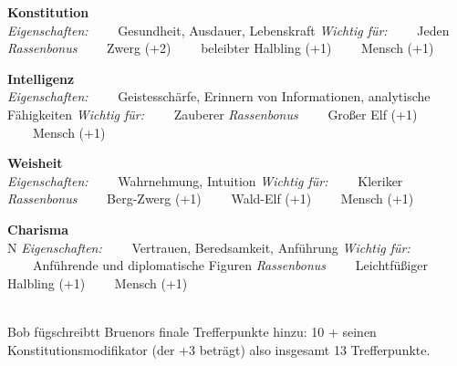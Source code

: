 \begin{dndtable}
	\textbf{Konstitution} \\
	\textit{Eigenschaften:} \newline
	\ \ \ \ Gesundheit, Ausdauer, Lebenskraft \newline
	\textit{Wichtig für:} \newline
	\ \ \ \ Jeden \newline
	\textit{Rassenbonus} \newline
	\ \ \ \ Zwerg (+2) \newline
	\ \ \ \ beleibter Halbling (+1) \newline
	\ \ \ \ Mensch (+1)
\end{dndtable}

\begin{dndtable}
	\textbf{Intelligenz} \\
	\textit{Eigenschaften:} \newline
	\ \ \ \ Geistesschärfe, Erinnern von Informationen, analytische Fähigkeiten \newline
	\textit{Wichtig für:} \newline
	\ \ \ \ Zauberer \newline
	\textit{Rassenbonus} \newline
	\ \ \ \ Großer Elf (+1) \newline
	\ \ \ \ Mensch (+1)
\end{dndtable}

\begin{dndtable}
	\textbf{Weisheit} \\
	\textit{Eigenschaften:} \newline
	\ \ \ \ Wahrnehmung, Intuition \newline
	\textit{Wichtig für:} \newline
	\ \ \ \ Kleriker \newline
	\textit{Rassenbonus} \newline
	\ \ \ \ Berg-Zwerg (+1) \newline
	\ \ \ \ Wald-Elf (+1) \newline
	\ \ \ \ Mensch (+1)
\end{dndtable}

\begin{dndtable}
	\textbf{Charisma} \\N
	\textit{Eigenschaften:} \newline
	\ \ \ \ Vertrauen, Beredsamkeit, Anführung \newline
	\textit{Wichtig für:} \newline
	\ \ \ \ Anführende und diplomatische Figuren \newline
	\textit{Rassenbonus} \newline
	\ \ \ \ Leichtfüßiger Halbling (+1) \newline
	\ \ \ \ Mensch (+1)
\end{dndtable}
\\
Bob fügschreibtt Bruenors finale Trefferpunkte hinzu:
10 + seinen Konstitutionsmodifikator (der +3 beträgt) also insgesamt 13 Trefferpunkte.

